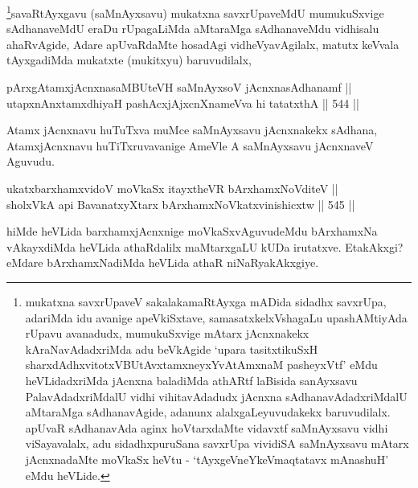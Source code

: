 \begin{artha}
\footnote{mukatxna savxrUpaveV sakalakamaRtAyxga mADida sidadhx
savxrUpa, adariMda idu avanige apeVkiSxtave, samasatxkelxVshagaLu
upashAMtiyAda rUpavu avanadudx, mumukuSxvige mAtarx jAcnxnakekx
kAraNavAdadxriMda adu beVkAgide `upara tasitxtikuSxH sharxdAdhxvitotxVBUtAvx\s \s tamxneyxYvA\s \s tAmxnaM pasheyxVtf' eMdu heVLidadxriMda jAcnxna
baladiMda athARtf laBisida sanAyxsavu PalavAdadxriMdalU vidhi
vihitavAdadudx jAcnxna sAdhanavAdadxriMdalU aMtaraMga sAdhanavAgide,
adanunx alalxgaLeyuvudakekx baruvudilalx. apUvaR sAdhanavAda
aginx hoVtarxdaMte vidavxtf saMnAyxsavu vidhi viSayavalalx, adu
sidadhxpuruSana savxrUpa vividiSA saMnAyxsavu mAtarx jAcnxnadaMte
moVkaSx heVtu - `tAyxgeVneYkeV\s maqtatavx mAnashuH' eMdu heVLide.}savaRtAyxgavu (saMnAyxsavu) mukatxna savxrUpaveMdU
mumukuSxvige sAdhanaveMdU eraDu rUpagaLiMda aMtaraMga sAdhanaveMdu
vidhisalu ahaRvAgide, Adare apUvaRdaMte hosadAgi vidheVyavAgilalx,
matutx keVvala tAyxgadiMda mukatxte (mukitxyu) baruvudilalx, 
\end{artha}

\begin{shl}
pArxgAtamxjAcnxnasaMBUteVH saMnAyxsoV jAcnxnasAdhanamf || \\
utapxnAnxtamxdhiyaH pashAcxjAjxcnXnameVva hi tatatxthA \hfill || 544 ||  
\end{shl}

\begin{artha}
Atamx jAcnxnavu huTuTxva muMce saMnAyxsavu jAcnxnakekx sAdhana,
AtamxjAcnxnavu huTiTxruvavanige AmeVle A saMnAyxsavu jAcnxnaveV
Aguvudu.
\end{artha}

\begin{shl}
\footnotemark[2]ukatxbarxhamxvidoV moVkaSx itayxtheVR bArxhamxNoVditeV || \\
\footnotemark[3]sholxVkA api BavanatxyXtarx bArxhamxNoVkatxvinishicxtw \hfill || 545 ||  
\end{shl}

\begin{artha}
hiMde heVLida barxhamxjAcnxnige moVkaSxvAguvudeMdu
bArxhamxNa vAkayxdiMda heVLida athaRdalilx maMtarxgaLU kUDa
irutatxve. EtakAkxgi? eMdare bArxhamxNadiMda heVLida athaR
niNaRyakAkxgiye.
\end{artha}

